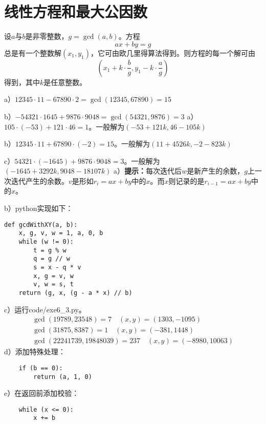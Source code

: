 \chapter{线性方程和最大公因数}
\begin{theorem}[线性方程定理]
设$a$与$b$是非零整数，$g=\gcd(a,b)$。方程
\[ax+by=g\]
总是有一个整数解$(x_1, y_1)$，它可由欧几里得算法得到。则方程的每一个解可由
\[\left(x_1+k\cdot\frac{b}{g}, y_1-k\cdot\frac{a}{g}\right)\]
得到，其中$k$是任意整数。
\end{theorem}
%
\exercise a）$12345\cdot 11 - 67890\cdot 2=\gcd(12345, 67890) = 15$\par
b）$-54321\cdot 1645 + 9876\cdot 9048 = \gcd(54321, 9876) = 3$
%
\exercise 
a）$105\cdot(-53)+121\cdot46=1$。一般解为$(-53+121k, 46-105k)$\par
b）$12345\cdot11+67890\cdot(-2)=15$。一般解为$(11+4526k, -2-823k)$\par
c）$54321\cdot(-1645)+9876\cdot9048=3$。一般解为$(-1645+3292k, 9048-18107k)$
%
\exercise 
a）{\bf 提示：}每次迭代后$w$是新产生的余数，$g$上一次迭代产生的余数。$v$是形如$r_i = ax + by$中的$x$。而$x$则记录的是$r_{i-1} = ax + by$中的$x$。\par
b）python实现如下：
\begin{lstlisting}
def gcdWithXY(a, b):
    x, g, v, w = 1, a, 0, b
    while (w != 0):
        t = g % w
        q = g // w
        s = x - q * v
        x, g = v, w
        v, w = s, t
    return (g, x, (g - a * x) // b)
\end{lstlisting}
c）运行code/exe6\_3.py。
\begin{gather*}
\gcd(19789, 23548) = 7\quad (x,y)=(1303,-1095) \\
\gcd(31875, 8387) = 1\quad (x,y)=(-381,1448) \\
\gcd(22241739, 19848039) = 237\quad (x,y)=(-8980,10063)
\end{gather*}
d）添加特殊处理：
\begin{lstlisting}
    if (b == 0):
        return (a, 1, 0)
\end{lstlisting}
e）在返回前添加校验：
\begin{lstlisting}
    while (x <= 0):
        x += b
\end{lstlisting}

%
\exercise 